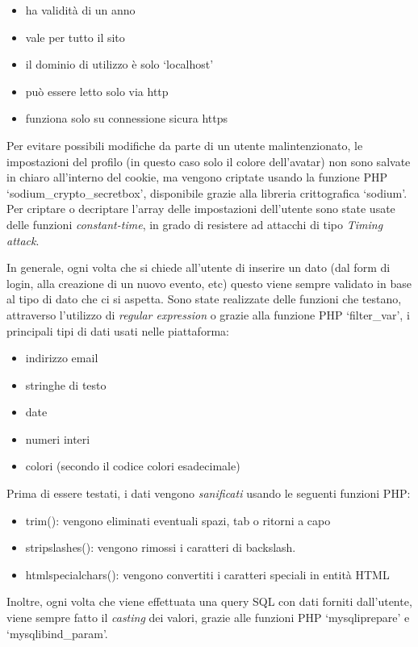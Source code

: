 \documentclass[italian,12pt,a4paper,oneside,final]{report}
\begin{document}
\begin{itemize}
	\item ha validità di un anno
	\item vale per tutto il sito
	\item il dominio di utilizzo è solo `localhost'
	\item può essere letto solo via http
	\item funziona solo su connessione sicura https
\end{itemize}

\noindent Per evitare possibili modifiche da parte di un utente malintenzionato, le impostazioni del profilo (in questo caso solo il colore dell'avatar) non sono salvate in chiaro all'interno del cookie, ma vengono criptate usando la funzione PHP `sodium\_crypto\_secretbox', disponibile grazie alla libreria crittografica `sodium'.
Per criptare o decriptare l'array delle impostazioni dell'utente sono state usate delle funzioni \textit{constant-time}, in grado di resistere ad attacchi di tipo \textit{Timing attack}.

In generale, ogni volta che si chiede all'utente di inserire un dato (dal form di login, alla creazione di un nuovo evento, etc) questo viene sempre validato in base al tipo di dato che ci si aspetta.
Sono state realizzate delle funzioni che testano, attraverso l'utilizzo di \textit{regular expression} o grazie alla funzione PHP `filter\_var', i principali tipi di dati usati nelle piattaforma:

\begin{itemize}
	\item indirizzo email
	\item stringhe di testo
	\item date
	\item numeri interi
	\item colori (secondo il codice colori esadecimale)
\end{itemize}
Prima di essere testati, i dati vengono \textit{sanificati} usando le seguenti funzioni PHP:

\begin{itemize}
	\item trim(): vengono eliminati eventuali spazi, tab o ritorni a capo
	\item stripslashes(): vengono rimossi i caratteri di backslash.
	\item htmlspecialchars(): vengono convertiti i caratteri speciali in entità HTML
\end{itemize}
Inoltre, ogni volta che viene effettuata una query SQL con dati forniti dall'utente, viene sempre fatto il \textit{casting} dei valori, grazie alle funzioni PHP `mysqli\textrightarrow prepare' e `mysqli\textrightarrow bind\_param'.
\end{document}
